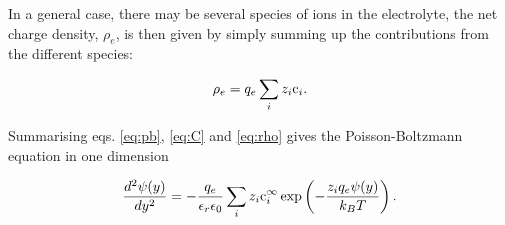 In a general case, there may be several species of ions in the
electrolyte, the net charge density, $\rho_e$, is then given by simply
summing up the contributions from the different species:

\begin{equation}\label{eq:rho}
\rho_e = q_e\sum_i z_i \mathrm{c}_i.
\end{equation}

Summarising eqs. \eqref{eq:pb}, \eqref{eq:C} and \eqref{eq:rho} gives
the Poisson-Boltzmann equation in one dimension

\begin{equation}\label{eq:pb_real}
\dfrac{d^2\mathrm{\psi}(y)}{dy^2} = -\frac{q_e}{\epsilon_r \epsilon_0}\sum_i z_i
\mathrm{c}_i^{\infty} \exp\left(-\frac{z_i q_e \mathrm{\psi}(y)}{k_BT}\right).
\end{equation}





